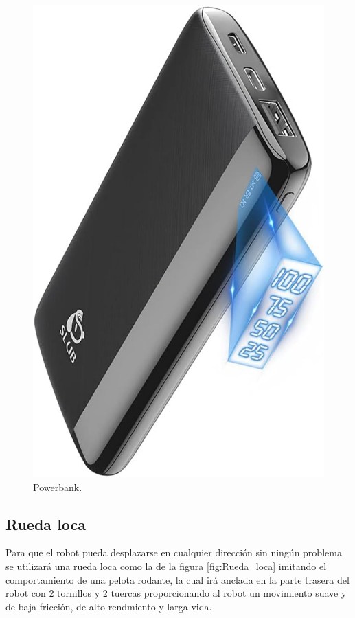 \begin{figure}[H]
\begin{minipage}{0.48\textwidth}
    \includegraphics[scale=0.13]{figs/powerbank.jpg}
    \caption{Powerbank.} 
    \label{fig:Powerbank}
  \end{minipage}
\end{figure}

\subsection{Rueda loca}
\label{subsec:rueda_loca}

Para que el robot pueda desplazarse en cualquier dirección sin ningún problema se utilizará una rueda loca como la de la figura \ref{fig:Rueda_loca} imitando el comportamiento de una pelota rodante, la cual irá anclada en la parte trasera del robot con 2 tornillos y 2 tuercas proporcionando al robot un movimiento suave y de baja fricción, de alto rendmiento y larga vida.



